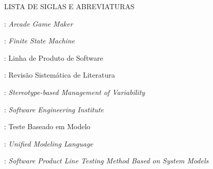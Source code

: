 \pagestyle{empty}
\large
\begin{center}
	LISTA DE SIGLAS E ABREVIATURAS
\end{center}

\normalsize

: \textit{Arcade Game Maker}

: \textit{Finite State Machine}

: Linha de Produto de Software

: Revisão Sistemática de Literatura

: \textit{Stereotype-based Management of Variability}

: \textit{Software Engineering Institute}

: Teste Baseado em Modelo

: \textit{Unified Modeling Language}

: \textit{Software Product Line Testing Method Based on System Models}

